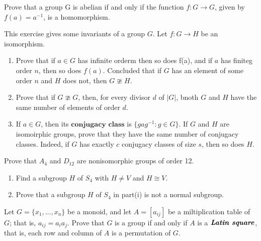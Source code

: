 \documentclass[15pt]{article}
\newenvironment{exercise}[2][Exercise]{\begin{trivlist}
\item[\hskip \labelsep {\bfseries #1}\hskip \labelsep {\bfseries #2.}]}
{\end{trivlist}}
\begin{document}
\begin{exercise}{1.48}
    Prove that a group G is abelian if and only if the function $f:G\rightarrow G$, given by $f(a) = a^{-1}$, 
    is a homomorphism.
\end{exercise}

\begin{exercise}{1.49}
    This exercise gives some invariants of a group $G$. Let $f:G\rightarrow H$ be an isomorphism.
    \begin{enumerate}
        \item[(i)] Prove that if $a\in G$ has infinite orderm then so does f(a), and if $a$ has finiteg order $n$,
        then so does $f(a)$. Concluded that if $G$ has an element of some order $n$ and $H$ does not, then $G \ncong H$.
        \item[(ii)] Prove that if $G\ncong G$, then, for every divisor $d$ of $|G|$, bnoth $G$ and $H$ have the same number of elements of order $d$.
        \item[(iii)] If $a\in G$, then its $\textbf{conjugacy class}$ is $\{gag^{-1}: g\in G\}$. If $G$ and $H$ are
        isomoirphic groups, prove that they have the same number of conjugacy classes. Indeed, if $G$ has exactly $c$ 
        conjugacy classes of size $s$, then so does $H$.
    \end{enumerate}
\end{exercise}


\begin{exercise}{1.50}
    Prove that $A_4$ and $D_{12}$ are nonisomorphic groups of order 12.
\end{exercise}

\begin{exercise}{1.51}
    \begin{enumerate}
        \item[(i)] Find a subgroup $H$ of $S_4$ with $H\neq V$ and $H\cong V$.
        \item[(ii)] Prove that a subgroup $H$ of $S_4$ in part(i) is not a normal subgroup.
    \end{enumerate}
\end{exercise}


\begin{exercise}{1.52}
    Let $G=\{x_1,..., x_n\}$ be a monoid, and let $A=\left[a_{ij}\right]$ be a miltiplication table of $G$; that is, $a_{ij} = a_ia_j$.
    Prove that $G$ is a group if and only if $A$ is a $\textbf{\textit{Latin square}}$, that is, each row and column of $A$ is a permutation of $G$.

\end{exercise}
\end{document}
